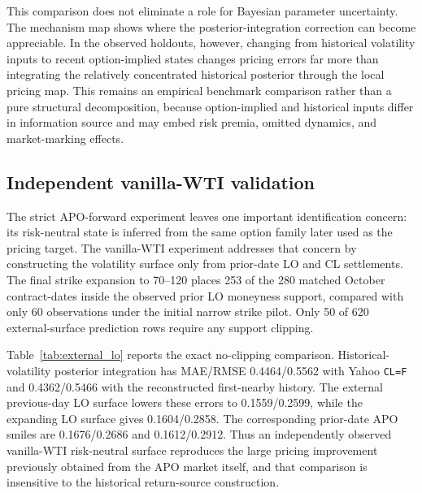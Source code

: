 This comparison does not eliminate a role for Bayesian parameter uncertainty. The mechanism map shows where the posterior-integration correction can become appreciable. In the observed holdouts, however, changing from historical volatility inputs to recent option-implied states changes pricing errors far more than integrating the relatively concentrated historical posterior through the local pricing map. This remains an empirical benchmark comparison rather than a pure structural decomposition, because option-implied and historical inputs differ in information source and may embed risk premia, omitted dynamics, and market-marking effects.

\subsection{Independent vanilla-WTI validation}\label{sec:external_lo_results}

The strict APO-forward experiment leaves one important identification concern: its risk-neutral state is inferred from the same option family later used as the pricing target. The vanilla-WTI experiment addresses that concern by constructing the volatility surface only from prior-date LO and CL settlements. The final strike expansion to 70--120 places 253 of the 280 matched October contract-dates inside the observed prior LO moneyness support, compared with only 60 observations under the initial narrow strike pilot. Only 50 of 620 external-surface prediction rows require any support clipping.

Table~\ref{tab:external_lo} reports the exact no-clipping comparison. Historical-volatility posterior integration has MAE/RMSE 0.4464/0.5562 with Yahoo \texttt{CL=F} and 0.4362/0.5466 with the reconstructed first-nearby history. The external previous-day LO surface lowers these errors to 0.1559/0.2599, while the expanding LO surface gives 0.1604/0.2858. The corresponding prior-date APO smiles are 0.1676/0.2686 and 0.1612/0.2912. Thus an independently observed vanilla-WTI risk-neutral surface reproduces the large pricing improvement previously obtained from the APO market itself, and that comparison is insensitive to the historical return-source construction.

